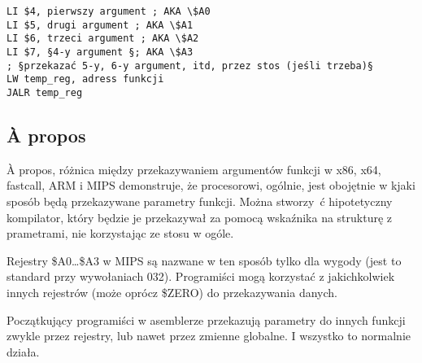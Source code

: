 \begin{lstlisting}[caption=MIPS,style=customasmMIPS]
LI $4, pierwszy argument ; AKA \$A0
LI $5, drugi argument ; AKA \$A1
LI $6, trzeci argument ; AKA \$A2
LI $7, §4-y argument §; AKA \$A3
; §przekazać 5-y, 6-y argument, itd, przez stos (jeśli trzeba)§
LW temp_reg, adress funkcji
JALR temp_reg
\end{lstlisting}

\subsection{À propos}

À propos, różnica między przekazywaniem argumentów funkcji w x86, x64, fastcall, ARM i MIPS demonstruje, że procesorowi, ogólnie, jest obojętnie w kjaki sposób będą
przekazywane parametry funkcji. Można stworzy ć hipotetyczny kompilator, który będzie je przekazywał za pomocą 
wskaźnika na strukturę z prametrami, nie korzystając ze stosu w ogóle.

Rejestry \$A0\dots \$A3 w MIPS są nazwane w ten sposób tylko dla wygody (jest to standard przy wywołaniach 032).
Programiści mogą korzystać z jakichkolwiek innych rejestrów (może oprócz \$ZERO) do
przekazywania danych.

Początkujący programiści w asemblerze przekazują parametry do innych funkcji
zwykle przez rejestry, lub nawet przez zmienne globalne.
I wszystko to normalnie działa.



